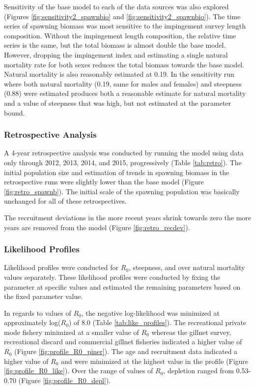 \documentclass[12pt,]{article}
\begin{document}
Sensitivity of the base model to each of the data sources was also
explored (Figures \ref{fig:sensitivity2_spawnbio} and
\ref{fig:sensitivity2_spawnbio}). The time series of spawning biomass
was most sensitive to the impingement survey length composition. Without
the impingement length composition, the relative time series is the
same, but the total biomass is almost double the base model. However,
dropping the impingement index and estimating a single natural mortality
rate for both sexes reduces the total biomass towards the base model.
Natural mortality is also reasonably estimated at 0.19. In the
sensitivity run where both natural mortality (0.19, same for males and
females) and steepness (0.88) were estimated produces both a reasonable
estimate for natural mortality and a value of steepness that was high,
but not estimated at the parameter bound.

\subsubsection{Retrospective Analysis}\label{retrospective-analysis}

A 4-year retrospective analysis was conducted by running the model using
data only through 2012, 2013, 2014, and 2015, progressively (Table
\ref{tab:retro}). The initial population size and estimation of trends
in spawning biomass in the retrospective runs were slightly lower than
the base model (Figure \ref{fig:retro_spawnb}). The initial scale of the
spawning population was basically unchanged for all of these
retrospectives.

The recruitment deviations in the more recent years shrink towards zero
the more years are removed from the model (Figure
\ref{fig:retro_recdev}).

\subsubsection{Likelihood Profiles}\label{likelihood-profiles}

Likelihood profiles were conducted for \(R_0\), steepness, and over
natural mortality values separately. These likelihood profiles were
conducted by fixing the parameter at specific values and estimated the
remaining parameters based on the fixed parameter value.

In regards to values of \(R_0\), the negative log-likelihood was
minimized at approximately log(\(R_0\)) of 8.0 (Table
\ref{tab:like_profiles}). The recreational private mode fishery
minimized at a smaller value of \(R_0\) whereas the gillnet survey,
recreational discard and commercial gillnet fisheries indicated a higher
value of \(R_0\) (Figure \ref{fig:profile_R0_piner}). The age and
recruitment data indicated a higher value of \(R_0\) and were minimized
at the highest value in the profile (Figure \ref{fig:profile_R0_like}).
Over the range of values of \(R_0\), depletion ranged from 0.53-0.70
(Figure \ref{fig:profile_R0_depl}).
\end{document}
